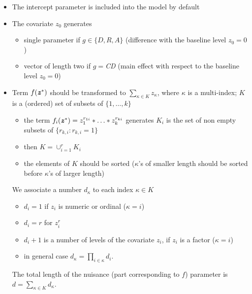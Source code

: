 \documentclass[11pt]{article}
\begin{document}
\begin{itemize}
\setlength\itemsep{-0.3em}
\item[]
The intercept parameter is included into the model by default
\item[]
The covariate $z_0$ generates\vspace{-2mm}
\begin{itemize}
\setlength\itemsep{-0.3em}
\item[]
single parameter if $g\in\{D,R,A\}$ (difference with the baseline level $z_0=0$)
\item[]
vector of length two if $g=${\it CD} (main effect with respect to the baseline level $z_0=0$)
\end{itemize}
\item[]
Term $f(\mbox{\textbf{\textit z}}^*)$ should be transformed to $\sum_{\kappa\in K} z_{\kappa}$, where $\kappa$ is a multi-index; $K$ is a (ordered) set of subsets of $\{1,\ldots,k\}$
\vspace{-2mm}
\begin{itemize}
\setlength\itemsep{-0.3em}
\item[]
the term $f_i(\mbox{\textbf{\textit z}}^*)=z_1^{r_{1i}}*\ldots*z_k^{r_{ki}}$ generates $K_i$ is the set of non empty subsets of $\{r_{k,i}:r_{k,i}=1\}$
\item[]
then $K=\cup_{i=1}^r K_i$
\item[]
the elements of $K$ should be sorted ($\kappa$'s of smaller length should be sorted before $\kappa$'s of larger length)
\end{itemize}
We associate a number $d_{\kappa}$ to each index $\kappa\in K$ \vspace{-2mm}
\begin{itemize}
\setlength\itemsep{-0.3em}
\item[]
$d_i=1$ if $z_i$ is numeric or ordinal ($\kappa=i$)
\item[]
$d_i=r$ for $z_i^r$ 
\item[]
$d_i+1$ is a number of levels of the covariate $z_i$, if $z_i$ is a factor ($\kappa=i$)
\item[]
in general case $d_{\kappa}=\prod_{i\in\kappa} d_i$. 
\end{itemize}
The total length of the nuisance (part corresponding to $f$) parameter is $d=\sum_{\kappa\in K} d_{\kappa}$. 
\end{itemize}
\end{document}
